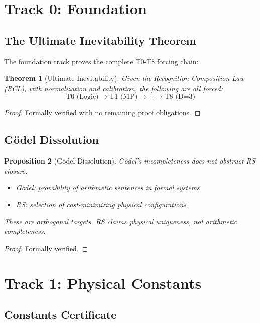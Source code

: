 \documentclass[12pt,a4paper]{article}
\newtheorem{theorem}{Theorem}[section]
\newtheorem{proposition}[theorem]{Proposition}
\theoremstyle{definition}
\theoremstyle{remark}
\begin{document}
\section{Track 0: Foundation}

\subsection{The Ultimate Inevitability Theorem}

The foundation track proves the complete T0-T8 forcing chain:

\begin{theorem}[Ultimate Inevitability]
Given the Recognition Composition Law (RCL), with normalization and calibration, 
the following are all forced:
\begin{equation}
\text{T0 (Logic)} \to \text{T1 (MP)} \to \cdots \to \text{T8 (D=3)}
\end{equation}
\end{theorem}

\begin{proof}
Formally verified with no remaining proof obligations.
\end{proof}

\subsection{Gödel Dissolution}

\begin{proposition}[Gödel Dissolution]
Gödel's incompleteness does not obstruct RS closure:
\begin{itemize}
\item Gödel: provability of arithmetic sentences in formal systems
\item RS: selection of cost-minimizing physical configurations
\end{itemize}
These are orthogonal targets. RS claims physical uniqueness, not arithmetic completeness.
\end{proposition}

\begin{proof}
Formally verified.
\end{proof}

\section{Track 1: Physical Constants}

\subsection{Constants Certificate}
\end{document}
